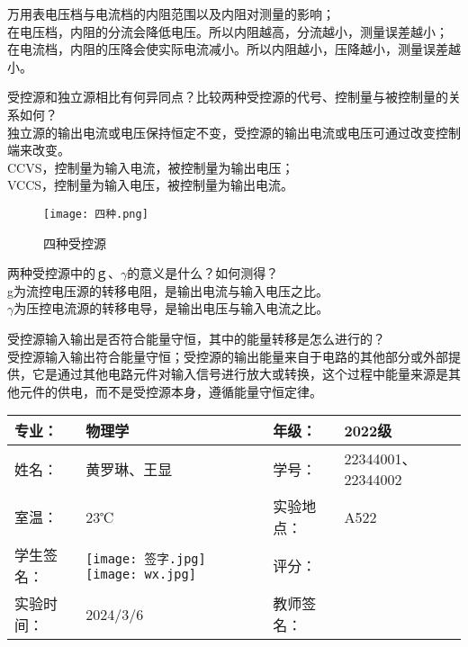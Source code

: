 \documentclass[dvipsnames, svgnames,a4paper,11pt]{article}
\begin{document}
	\begin{question}
		万用表电压档与电流档的内阻范围以及内阻对测量的影响；\\
		在电压档，内阻的分流会降低电压。所以内阻越高，分流越小，测量误差越小；\\
		在电流档，内阻的压降会使实际电流减小。所以内阻越小，压降越小，测量误差越小。
	\end{question}
	\begin{question}
		受控源和独立源相比有何异同点？比较两种受控源的代号、控制量与被控制量的关系如何？\\
		独立源的输出电流或电压保持恒定不变，受控源的输出电流或电压可通过改变控制端来改变。\\
		CCVS，控制量为输入电流，被控制量为输出电压；\\
		 VCCS，控制量为输入电压，被控制量为输出电流。
		 \end{question}
		 \begin{figure}[htbp]
		 	\centering
		 	\texttt{[image: 四种.png]}
		 	\caption{四种受控源}
		 \end{figure}
	
	\begin{question}
		两种受控源中的ｇ、$\gamma$的意义是什么？如何测得？\\
		g为流控电压源的转移电阻，是输出电流与输入电压之比。\\
		$\gamma$为压控电流源的转移电导，是输出电压与输入电流之比。
	\end{question}
	\begin{question}
		受控源输入输出是否符合能量守恒，其中的能量转移是怎么进行的？\\
		受控源输入输出符合能量守恒；受控源的输出能量来自于电路的其他部分或外部提供，它是通过其他电路元件对输入信号进行放大或转换，这个过程中能量来源是其他元件的供电，而不是受控源本身，遵循能量守恒定律。
	\end{question}
	\clearpage
	
	\begin{table}
		\renewcommand\arraystretch{1.7}
		\centering
		\begin{tabularx}{\textwidth}{|X|X|X|X|}
			\hline
			专业： & 物理学 & 年级： & 2022级 \\
			\hline
			姓名： & 黄罗琳、王显 & 学号： & 22344001、22344002\\
			\hline
			室温： &  23℃& 实验地点： & A522 \\
			\hline
			学生签名：& \texttt{[image: 签字.jpg]} \texttt{[image: wx.jpg]} & 评分： &\\
			\hline
			实验时间：& 2024/3/6 & 教师签名：&\\
			\hline
		\end{tabularx}
	\end{table}
	
\end{document}
